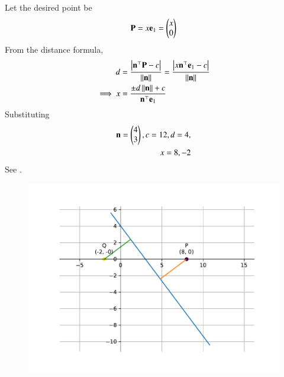 Let the desired point be
\begin{align}
	\mathbf{P} = x\mathbf{e}_{1} = \begin{pmatrix}x\\0\end{pmatrix}
\end{align}
From the distance formula, 
\begin{align}
	d &= \frac{\left\vert\mathbf{n}^\top\mathbf{P}-c\right\vert}{\left\lVert\mathbf{n}\right\rVert}
	  = \frac{\left\vert x\mathbf{n}^\top\mathbf{e}_{1}-c\right\vert}{\left\lVert\mathbf{n}\right\rVert}
	  \\
	  \implies 
		x &= \frac{\pm d\left\lVert\mathbf{n}\right\rVert+c}{\mathbf{n}^\top\mathbf{e}_{1}}
\end{align}
Substituting
\begin{align}
		\mathbf{n} = \begin{pmatrix}4\\3\end{pmatrix} , c = 12,
	d = 4,
	\\
	x = 8,
	 -2
\end{align}
See .	
\begin{figure}[H]
	\begin{center} 
	    \includegraphics[width=0.75\columnwidth]{chapters/11/10/3/5/figs/fig.pdf}
	\end{center}
\caption{}
\label{fig:11/10/3/5/Fig1}
\end{figure}


